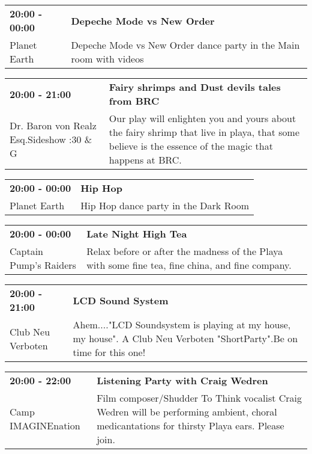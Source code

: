 \begin{tabular}{ p{1in} p{2.2in} }
    \textbf{20:00 - 00:00} & \textbf{Depeche Mode vs New Order} \\
    Planet Earth \newline  & Depeche Mode vs New Order dance party in the Main room with videos \\
    \hline 
\end{tabular}
    
\begin{tabular}{ p{1in} p{2.2in} }
    \textbf{20:00 - 21:00} & \textbf{Fairy shrimps and Dust devils tales from BRC} \\
    Dr. Baron von Realz Esq.Sideshow \newline 4:30 \& G & Our play will enlighten you and yours about the fairy shrimp that live in playa, that some believe is the essence of the magic that happens at BRC. \\
    \hline 
\end{tabular}
    
\begin{tabular}{ p{1in} p{2.2in} }
    \textbf{20:00 - 00:00} & \textbf{Hip Hop} \\
    Planet Earth \newline  & Hip Hop dance party in the Dark Room \\
    \hline 
\end{tabular}
    
\begin{tabular}{ p{1in} p{2.2in} }
    \textbf{20:00 - 00:00} & \textbf{Late Night High Tea} \\
    Captain Pump's Raiders \newline  & Relax before or after the madness of the Playa with some fine tea, fine china, and fine company. \\
    \hline 
\end{tabular}
    
\begin{tabular}{ p{1in} p{2.2in} }
    \textbf{20:00 - 21:00} & \textbf{LCD Sound System} \\
    Club Neu Verboten \newline  & Ahem...."LCD Soundsystem is playing at my house, my house". A Club Neu Verboten "ShortParty".Be on time for this one! \\
    \hline 
\end{tabular}
    
\begin{tabular}{ p{1in} p{2.2in} }
    \textbf{20:00 - 22:00} & \textbf{Listening Party with Craig Wedren} \\
    Camp IMAGINEnation \newline  & Film composer/Shudder To Think vocalist Craig Wedren will be performing ambient, choral medicantations for thirsty Playa ears.  Please join. \\
    \hline 
\end{tabular}
    

